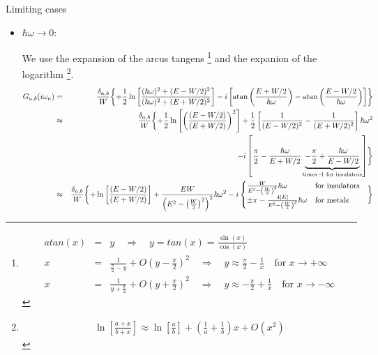 \documentclass[11pt,a4paper]{report}
\begin{document}
Limiting cases
\begin{itemize}
\item $\hbar\omega\rightarrow 0$:

We use the expansion of the arcus tangens
\footnote{
\begin{eqnarray}
  atan(x)&=&y\quad\Rightarrow\quad y=tan(x)=\frac{\sin(x)}{\cos(x)}
\nonumber\\
x&=&\frac{1}{\frac{\pi}{2}-y}+O(y-\frac{\pi}{2})^2
\quad\Rightarrow\quad 
y\approx\frac{\pi}{2}-\frac{1}{x}\quad\text{for $x\rightarrow+\infty$}
\nonumber\\
x&=&\frac{1}{y+\frac{\pi}{2}}+O(y+\frac{\pi}{2})^2
\quad\Rightarrow\quad 
y\approx-\frac{\pi}{2}+\frac{1}{x}\quad\text{for $x\rightarrow-\infty$}
\end{eqnarray}
} and the expanion of the logarithm
\footnote{
\begin{eqnarray}
\ln\left[\frac{a+x}{b+x}\right]\approx
\ln\left[\frac{a}{b}\right]+\left(\frac{1}{a}+\frac{1}{b}\right)x+O(x^2)
\end{eqnarray}
}.
\begin{eqnarray}
G_{a,b}(i\omega_\nu)&=&
\frac{\delta_{a,b}}{W}
\biggl\lbrace
+\frac{1}{2}\ln\left[
\frac{(\hbar\omega)^2+(E-W/2)^2}{(\hbar\omega)^2+(E+W/2)^2}
\right]
-i \left[\atan\left(\frac{E+W/2}{\hbar\omega}\right)
-\atan\left(\frac{E-W/2}{\hbar\omega}\right)\right]
\biggr\rbrace
\nonumber\\
%
&\approx&
\frac{\delta_{a,b}}{W}
\biggl\lbrace
+\frac{1}{2}\ln\left[\left(
\frac{(E-W/2)}{(E+W/2)}\right)^2
\right]
+\frac{1}{2}\left[\frac{1}{(E-W/2)^2}-\frac{1}{(E+W/2)^2}\right]\hbar\omega^2
\nonumber\\
&&-i \left[\frac{\pi}{2}-\frac{\hbar\omega}{E+W/2}
\underbrace{
-\frac{\pi}{2}+\frac{\hbar\omega}{E-W/2}
}_{\text{times -1 for insulators}}\right]
\biggr\rbrace
\nonumber\\
%
&\approx&
\frac{\delta_{a,b}}{W}
\biggl\lbrace
+\ln\left[
\frac{(E-W/2)}{(E+W/2)}
\right]
+\frac{EW}{\left(E^2-\left(\frac{W}{2}\right)^2\right)^2}\hbar\omega^2
-i 
\begin{cases}
\frac{W}{E^2-\left(\frac{W}{2}\right)^2}\hbar\omega
&\text{for insulators}\\
\pm\pi-\frac{4|E|}{E^2-\left(\frac{W}{2}\right)^2}\hbar\omega
&\text{for metals}\\
\end{cases}
\hspace{0.3cm}\biggr\rbrace
\nonumber\\
\end{eqnarray}

\end{itemize}
\end{document}
